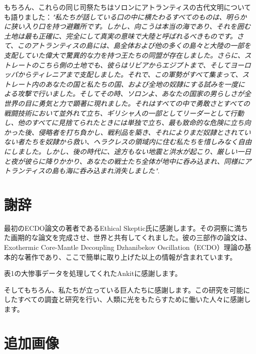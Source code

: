 \documentclass[10pt,twocolumn,letterpaper]{article}
\begin{document}
もちろん、これらの同じ司祭たちはソロンにアトランティスの古代文明についても語りました：\textit{"私たちが話している口の中に横たわるすべてのものは、明らかに狭い入り口を持つ避難所です。しかし、向こうは本当の海であり、それを囲む土地は最も正確に、完全にして真実の意味で大陸と呼ばれるべきものです。さて、このアトランティスの島には、島全体および他の多くの島々と大陸の一部を支配していた偉大で驚異的な力を持つ王たちの同盟が存在しました。さらに、ストレートのこちら側の土地でも、彼らはリビアからエジプトまで、そしてヨーロッパからティレニアまで支配しました。それで、この軍勢がすべて集まって、ストレート内のあなたの国と私たちの国、および全地の奴隷にする試みを一度による攻撃で行いました。そしてその時、ソロンよ、あなたの国家の男らしさが全世界の目に勇気と力で顕著に現れました。それはすべての中で勇敢さとすべての戦闘技術において並外れて立ち、ギリシャ人の一部としてリーダーとして行動し、他のすべてに見捨てられたときには単独で立ち、最も致命的な危険に立ち向かった後、侵略者を打ち負かし、戦利品を築き、それによりまだ奴隷とされていない者たちを奴隷から救い、ヘラクレスの領域内に住む私たちを惜しみなく自由にしました。しかし、後の時代に、途方もない地震と洪水が起こり、厳しい一日と夜が彼らに降りかかり、あなたの戦士たち全体が地中に呑み込まれ、同様にアトランティスの島も海に呑み込まれ消失しました"}.

\section{謝辞}

最初のECDO論文の著者であるEthical Skeptic氏に感謝します。その洞察に満ちた画期的な論文を完成させ、世界と共有してくれました。彼の三部作の論文\cite{1}は、Exothermic Core-Mantle Decoupling Dzhanibekov Oscillation（ECDO）理論の基本的な著作であり、ここで簡単に取り上げた以上の情報が含まれています。

表1の大惨事データを処理してくれたAnkitに感謝します。

そしてもちろん、私たちが立っている巨人たちに感謝します。この研究を可能にしたすべての調査と研究を行い、人類に光をもたらすために働いた人々に感謝します。

\clearpage
\twocolumn

\section{追加画像}
\end{document}
